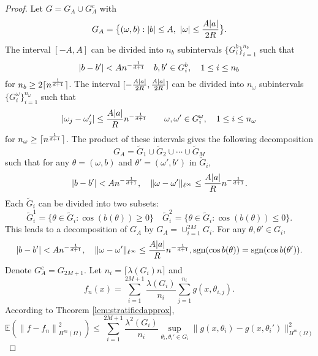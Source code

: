 \begin{proof}
Let $G = G_A\cup G_A^c$ with
$$
G_A=\big \{(\omega, b): |b|\le A,\ |\omega|\le {A|a|\over 2R}\big \}.
$$
The interval $[-A,A]$ can be divided into $n_b$ subintervals  $\{G_i^b\}_{i=1}^{n_b}$ such that 
$$
|b - b'|<An^{-{1\over d+1}}\quad b, b'\in G_i^b,\quad 1\leq i\leq n_b
$$ 
for $n_b\ge 2\lceil  n^{1\over d+1}\rceil$. 
The interval $[-{A|a|\over 2R}, {A|a|\over 2R}]$ can be divided into $n_\omega$ subintervals $\{G_i^\omega \}_{i=1}^{n_\omega}$ such that
$$
|\omega_j - \omega'_j| \leq {A|a|\over R}n^{-{1\over d+1}}\qquad  \omega,   \omega' \in G_i^\omega,\quad 1\leq i\leq n_\omega
$$
for $n_\omega\ge \lceil n^{1\over d+1}\rceil$.
The product of these intervals gives the following decomposition 
$$
G_A=\tilde G_1\cup \tilde G_2\cup \cdots \cup \tilde G_M
$$
such that for any $\theta=(\omega, b)$ and $\theta'=(\omega',b')$ in $\tilde G_i$,
\begin{equation}
|b - b'|<An^{-{1\over d+1}}, \quad \|\omega - \omega'\|_{\ell^\infty} \leq {A|a|\over R}n^{-{1\over d+1}}.
\end{equation}
Each $\tilde G_i$ can be divided into two subsets:
\begin{equation}
\tilde G_i^1 = \{\theta\in \tilde G_i: \cos (b(\theta))\ge 0\}\quad \tilde G_i^2 = \{\theta\in \tilde G_i: \cos (b(\theta))\le 0\}.
\end{equation}
This leads to a decomposition of $G_A$ by $G_A=\cup_{i=1}^{2M} G_i$. For any $ \theta, \theta'\in G_i$, 
\begin{equation}
|b - b'|<An^{-{1\over d+1}}, \quad \|\omega - \omega'\|_{\ell^\infty} \leq {A|a|\over R}n^{-{1\over d+1}}, {\rm sgn} (\cos b(\theta))={\rm sgn} (\cos b(\theta')).
\end{equation} 
Denote $G_A^c = G_{2M+1}$. Let $n_i=\lceil \lambda(G_i)n\rceil$ and 
\begin{equation}
f_{n}(x)=\sum_{i=1}^{2 M+1} \frac{\lambda(G_{i})}{n_{i}} \sum_{j=1}^{n_{i}}g(x,\theta_{i,j}).
\end{equation}
According to Theorem \ref{lem:stratifiedapprox},  
\begin{equation} 
\mathbb{E}\left(\left\|f - f_{n}\right\|_{H^{m}(\Omega)}^{2}\right)\le
 \sum_{i=1}^{2M+1}  \frac{\lambda^2(G_i)}{n_{i}}  \sup_{\theta_{i},\theta_{i}'\in G_i} \| g(x,\theta_i) - g(x,\theta_i')\|^2_{H^m(\Omega)}  
\end{equation}


\end{proof}
